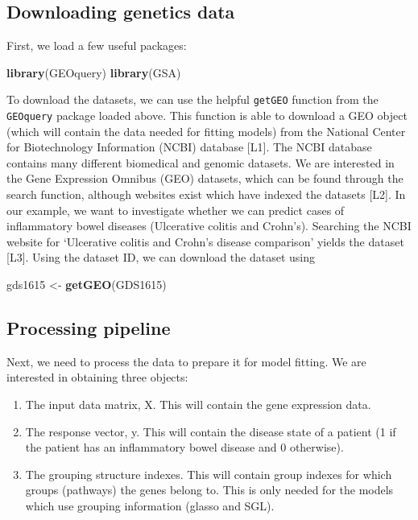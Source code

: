 \documentclass[
]{article}
\newenvironment{Shaded}{\begin{snugshade}}{\end{snugshade}}
\newcommand{\FunctionTok}[1]{\textcolor[rgb]{0.13,0.29,0.53}{\textbf{#1}}}
\newcommand{\NormalTok}[1]{#1}
\newcommand{\OtherTok}[1]{\textcolor[rgb]{0.56,0.35,0.01}{#1}}
\newcommand{\StringTok}[1]{\textcolor[rgb]{0.31,0.60,0.02}{#1}}
\providecommand{\tightlist}{%
  \setlength{\itemsep}{0pt}\setlength{\parskip}{0pt}}
\begin{document}
\subsection{Downloading genetics data}\label{downloading-genetics-data}

First, we load a few useful packages:

\begin{Shaded}
\begin{Highlighting}[]
\FunctionTok{library}\NormalTok{(GEOquery)}
\FunctionTok{library}\NormalTok{(GSA)}
\end{Highlighting}
\end{Shaded}

To download the datasets, we can use the helpful \texttt{getGEO}
function from the \texttt{GEOquery} package loaded above. This function
is able to download a GEO object (which will contain the data needed for
fitting models) from the National Center for Biotechnology Information
(NCBI) database {[}L1{]}. The NCBI database contains many different
biomedical and genomic datasets. We are interested in the Gene
Expression Omnibus (GEO) datasets, which can be found through the search
function, although websites exist which have indexed the datasets
{[}L2{]}. In our example, we want to investigate whether we can predict
cases of inflammatory bowel diseases (Ulcerative colitis and Crohn's).
Searching the NCBI website for `Ulcerative colitis and Crohn's disease
comparison' yields the dataset {[}L3{]}. Using the dataset ID, we can
download the dataset using

\begin{Shaded}
\begin{Highlighting}[]
\NormalTok{gds1615 }\OtherTok{\textless{}{-}} \FunctionTok{getGEO}\NormalTok{(}\StringTok{\textquotesingle{}GDS1615\textquotesingle{}}\NormalTok{)}
\end{Highlighting}
\end{Shaded}

\subsection{Processing pipeline}\label{processing-pipeline}

Next, we need to process the data to prepare it for model fitting. We
are interested in obtaining three objects:

\begin{enumerate}
\def\labelenumi{\arabic{enumi}.}
\tightlist
\item
  The input data matrix, X. This will contain the gene expression data.
\item
  The response vector, y. This will contain the disease state of a
  patient (1 if the patient has an inflammatory bowel disease and 0
  otherwise).
\item
  The grouping structure indexes. This will contain group indexes for
  which groups (pathways) the genes belong to. This is only needed for
  the models which use grouping information (glasso and SGL).
\end{enumerate}
\end{document}
